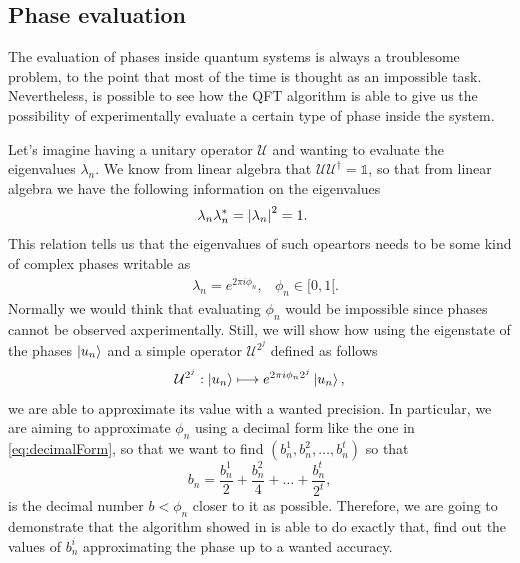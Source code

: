\subsection{Phase evaluation}

The evaluation of phases inside quantum systems is always a troublesome problem, to the point that most of the time is thought as an impossible task. Nevertheless, is possible to see how the QFT algorithm is able to give us the possibility of experimentally evaluate a certain type of phase inside the system.

Let's imagine having a unitary operator $\mathcal{U}$ and wanting to evaluate the eigenvalues $\lambda_n$. We know from linear algebra that $\mathcal{U}\mathcal{U}^\dagger = \mathbb{1}$, so that from linear algebra we have the following information on the eigenvalues
\begin{align}
    &\lambda_n\lambda_n^* = \abs{\lambda_n}^2 = 1.
\end{align}
This relation tells us that the eigenvalues of such opeartors needs to be some kind of complex phases writable as
\begin{align}
    &\lambda_n = e^{2\pi i \phi_n}, &\phi_n \in [0, 1[.
\end{align}
Normally we would think that evaluating $\phi_n$ would be impossible since phases cannot be observed axperimentally. Still, we will show how using the eigenstate of the phases $\ket{u_n}$ and a simple operator $\mathcal{U}^{2^j}$ defined as follows
\begin{equation}
    \mathcal{U}^{2^j}: \ket{u_n} \longmapsto e^{2\pi i \phi_n 2^j} \ket{u_n},
\end{equation}
we are able to approximate its value with a wanted precision. In particular, we are aiming to approximate $\phi_n$ using a decimal form like the one in \eqref{eq:decimalForm}, so that we want to find $(b_n^1, b_n^2, \dots, b_n^t)$ so that 
\begin{equation}
    b_n = \frac{b_n^1}{2} + \frac{b_n^2}{4} + \dots + \frac{b_n^t}{2^t},
\end{equation}
is the decimal number $b < \phi_n$ closer to it as possible. Therefore, we are going to demonstrate that the algorithm showed in  is able to do exactly that, find out the values of $b_n^i$ approximating the phase up to a wanted accuracy.

